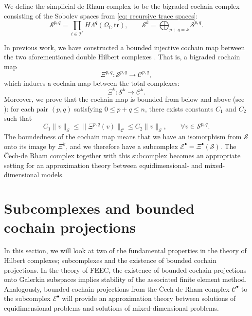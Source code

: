 \documentclass[reqno]{amsart}
\numberwithin{equation}{section}
\theoremstyle{definition}
\newcommand{\Cc}{\mathcal{C}}
\newcommand{\Ec}{\mathcal{E}}
\newcommand{\Ic}{\mathcal{I}}
\newcommand{\Sc}{\mathcal{S}}
\newcommand{\tr}{\mathrm{tr}}
\begin{document}
We define the simplicial de Rham complex to be the bigraded cochain complex consisting of the Sobolev spaces from \cref{eq: recursive trace spaces}:
\begin{equation}
\Sc^{p,q} = \prod_{i \in \Ic^p} H\Lambda^q(\Omega_i, \tr), \qquad \Sc^k = \bigoplus_{p+q=k} \Sc^{p,q}.
\end{equation}












In previous work, we have constructed a bounded injective cochain map between the two aforementioned double Hilbert complexes \cite{holmen2024injective}. That is, a bigraded cochain map
\begin{equation}
\Xi^{p,q}: \Sc^{p,q} \to \Cc^{p,q},
\end{equation}
which induces a cochain map between the total complexes:
\begin{equation}
\Xi^{k}: \Sc^{k} \to \Cc^{k}. \label{eq: embedding}
\end{equation}
Moreover, we prove that the cochain map is bounded from below and above (see \cite[Section 4.1]{holmen2024injective}): for each pair $(p,q)$ satisfying $0 \leq p+q \leq n$, there exists constants $C_1$ and $C_2$ such that
\begin{equation} \label{eq: bounded cochain map}
C_1 \|v\|_\Sc \leq \|\Xi^{p,q}(v)\|_\Cc \leq C_2 \|v\|_\Sc, \qquad \forall v \in \Sc^{p,q}.
\end{equation}
The boundedness of the cochain map means that we have an isomorphism from $\Sc$ onto its image by $\Xi^k$, and we therefore have a subcomplex $\Ec^\bullet = \Xi^\bullet(\Sc)$. The \v{C}ech-de Rham complex together with this subcomplex becomes an appropriate setting for an approximation theory between equidimensional- and mixed-dimensional models.



\section{Subcomplexes and bounded cochain projections}\label{section: bcp}
In this section, we will look at two of the fundamental properties in the theory of Hilbert complexes; subcomplexes and the existence of bounded cochain projections. In the theory of FEEC, the existence of bounded cochain projections onto Galerkin subspaces implies stability of the associated finite element method. Analogously, bounded cochain projections from the \v{C}ech-de Rham complex $\Cc^\bullet$ to the subcomplex $\Ec^\bullet$ will provide an approximation theory between solutions of equidimensional problems and solutions of mixed-dimensional problems.
\end{document}
